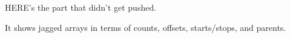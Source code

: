 \documentclass[aspectratio=169]{beamer}
\begin{document}












\begin{frame}{}
\LARGE
\vspace{1 cm}
HERE's the part that didn't get pushed.

\vspace{1 cm}
It shows jagged arrays in terms of counts, offsets, starts/stops, and parents.
\end{frame}


\begin{frame}{}
\end{frame}
\end{document}
